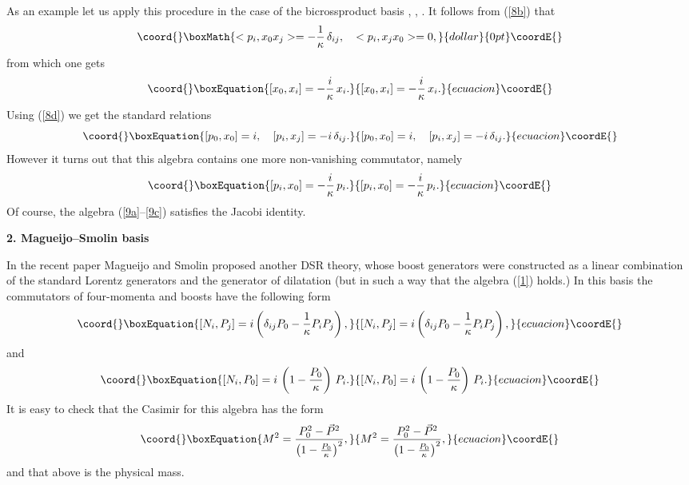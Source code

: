 \documentclass [prd,twocolumn,nofootinbib,showpacs]  {revtex4}
\begin{document}
As an example let us apply this procedure in the case of the
bicrossproduct basis \cite{maru}, \cite{crossalg}, \cite{luno}. It
follows from (\ref{8b}) that
$$\coord{}\boxMath{
<p_i, x_0 x_j> = -\frac1\kappa\, \delta_{ij}, \quad <p_i,  x_jx_0>=0,
}{dollar}{0pt}\coordE{}$$
from which one gets
\begin{equation}\coord{}\boxEquation{\label{9a}
[x_0, x_i] = -\frac{i}\kappa\, x_i.
}{[x_0, x_i] = -\frac{i}\kappa\, x_i.
}{ecuacion}\coordE{}\end{equation}
Using  (\ref{8d}) we get the standard relations
\begin{equation}\coord{}\boxEquation{\label{9b}
[p_0, x_0] = i, \quad [p_i, x_j] = -i \, \delta_{ij}.
}{[p_0, x_0] = i, \quad [p_i, x_j] = -i \, \delta_{ij}.
}{ecuacion}\coordE{}\end{equation}
However it turns out that this algebra contains one more
non-vanishing commutator, namely
\begin{equation}\coord{}\boxEquation{\label{9c}
 [p_i, x_0] = -\frac{i}\kappa\, p_i.
}{[p_i, x_0] = -\frac{i}\kappa\, p_i.
}{ecuacion}\coordE{}\end{equation}
Of course, the algebra (\ref{9a}--\ref{9c}) satisfies the Jacobi identity.
\newline

\noindent
\textbf{ 2. Magueijo--Smolin basis}
\newline

In the recent paper \cite{JoaoLee} Magueijo and Smolin proposed
another DSR theory, whose boost  generators were constructed as a
linear combination of the standard Lorentz generators and the
generator of dilatation (but in such a way that the algebra
(\ref{1}) holds.) In this basis the commutators of four-momenta
\coordHE{} and boosts have the following form
\begin{equation}\coord{}\boxEquation{\label{10}
   \left[N_{i}, P_{j}\right] =  i\left( \delta_{ij}P_0 -
  {1\over \kappa} P_{i}P_{j} \right),
}{\left[N_{i}, P_{j}\right] =  i\left( \delta_{ij}P_0 -
  {1\over \kappa} P_{i}P_{j} \right),
}{ecuacion}\coordE{}\end{equation}
and
\begin{equation}\coord{}\boxEquation{\label{11}
  \left[N_{i},P_{0}\right] = i\, \left( 1 - {P_0\over \kappa}\right)\,P_{i}.
}{\left[N_{i},P_{0}\right] = i\, \left( 1 - {P_0\over \kappa}\right)\,P_{i}.
}{ecuacion}\coordE{}\end{equation}
It is easy to check that the Casimir for this algebra has the form
\begin{equation}\coord{}\boxEquation{\label{12}
 M^2 = \frac{P_{0}^2 - \vec{P}{}^2}{\left(1- \frac{P_0}\kappa\right)^2},
}{M^2 = \frac{P_{0}^2 - \vec{P}{}^2}{\left(1- \frac{P_0}\kappa\right)^2},
}{ecuacion}\coordE{}\end{equation}
and that \coordHE{} above is the physical mass.
\end{document}
